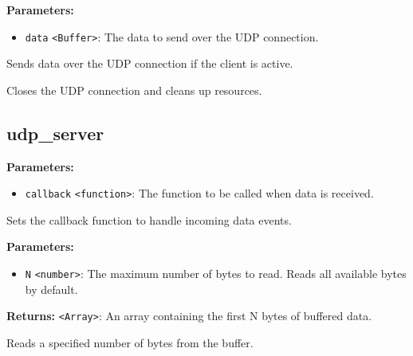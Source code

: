 \documentclass[12pt,a4paper]{article}
\begin{document}
\noindent \textbf{Parameters:}
\begin{itemize}
  \item \texttt{data} \texttt{<Buffer>}: The data to send over the UDP connection.
\end{itemize}

\noindent Sends data over the UDP connection if the client is active.

\vspace{5mm}
\noindent {}


\noindent Closes the UDP connection and cleans up resources.


\subsection{udp\_server}
\vspace{5mm}
\noindent {}


\noindent \textbf{Parameters:}
\begin{itemize}
  \item \texttt{callback} \texttt{<function>}: The function to be called when data is received.
\end{itemize}

\noindent Sets the callback function to handle incoming data events.

\vspace{5mm}
\noindent {}


\noindent \textbf{Parameters:}
\begin{itemize}
  \item \texttt{N} \texttt{<number>}: The maximum number of bytes to read. Reads all available bytes by default.
\end{itemize}

\noindent \textbf{Returns:} \texttt{<Array>}: An array containing the first N bytes of buffered data.

\noindent Reads a specified number of bytes from the buffer.

\vspace{5mm}
\noindent {}
\end{document}
